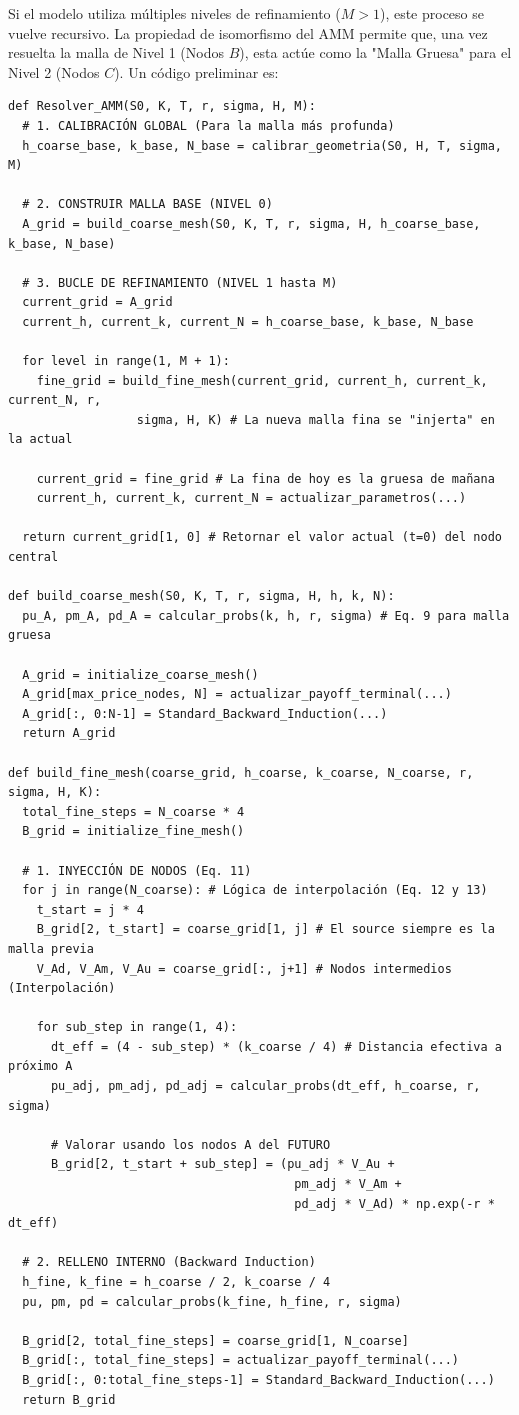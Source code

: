 Si el modelo utiliza múltiples niveles de refinamiento ($M>1$), este proceso se vuelve recursivo. La propiedad de isomorfismo del AMM permite que, una vez resuelta la malla de Nivel 1 (Nodos $B$), esta actúe como la "Malla Gruesa" para el Nivel 2 (Nodos $C$).
Un código preliminar es:

\begin{verbatim}
def Resolver_AMM(S0, K, T, r, sigma, H, M):
  # 1. CALIBRACIÓN GLOBAL (Para la malla más profunda)
  h_coarse_base, k_base, N_base = calibrar_geometria(S0, H, T, sigma, M)

  # 2. CONSTRUIR MALLA BASE (NIVEL 0)
  A_grid = build_coarse_mesh(S0, K, T, r, sigma, H, h_coarse_base, k_base, N_base)
  
  # 3. BUCLE DE REFINAMIENTO (NIVEL 1 hasta M)
  current_grid = A_grid
  current_h, current_k, current_N = h_coarse_base, k_base, N_base
  
  for level in range(1, M + 1):
    fine_grid = build_fine_mesh(current_grid, current_h, current_k, current_N, r, 
                  sigma, H, K) # La nueva malla fina se "injerta" en la actual
    
    current_grid = fine_grid # La fina de hoy es la gruesa de mañana
    current_h, current_k, current_N = actualizar_parametros(...)
  
  return current_grid[1, 0] # Retornar el valor actual (t=0) del nodo central

def build_coarse_mesh(S0, K, T, r, sigma, H, h, k, N):
  pu_A, pm_A, pd_A = calcular_probs(k, h, r, sigma) # Eq. 9 para malla gruesa
  
  A_grid = initialize_coarse_mesh()
  A_grid[max_price_nodes, N] = actualizar_payoff_terminal(...)
  A_grid[:, 0:N-1] = Standard_Backward_Induction(...)
  return A_grid

def build_fine_mesh(coarse_grid, h_coarse, k_coarse, N_coarse, r, sigma, H, K):   
  total_fine_steps = N_coarse * 4
  B_grid = initialize_fine_mesh()
  
  # 1. INYECCIÓN DE NODOS (Eq. 11)
  for j in range(N_coarse): # Lógica de interpolación (Eq. 12 y 13)
    t_start = j * 4
    B_grid[2, t_start] = coarse_grid[1, j] # El source siempre es la malla previa
    V_Ad, V_Am, V_Au = coarse_grid[:, j+1] # Nodos intermedios (Interpolación)
    
    for sub_step in range(1, 4):
      dt_eff = (4 - sub_step) * (k_coarse / 4) # Distancia efectiva a próximo A
      pu_adj, pm_adj, pd_adj = calcular_probs(dt_eff, h_coarse, r, sigma)
      
      # Valorar usando los nodos A del FUTURO
      B_grid[2, t_start + sub_step] = (pu_adj * V_Au + 
                                        pm_adj * V_Am + 
                                        pd_adj * V_Ad) * np.exp(-r * dt_eff)
    
  # 2. RELLENO INTERNO (Backward Induction)
  h_fine, k_fine = h_coarse / 2, k_coarse / 4
  pu, pm, pd = calcular_probs(k_fine, h_fine, r, sigma)

  B_grid[2, total_fine_steps] = coarse_grid[1, N_coarse]
  B_grid[:, total_fine_steps] = actualizar_payoff_terminal(...)
  B_grid[:, 0:total_fine_steps-1] = Standard_Backward_Induction(...)
  return B_grid
\end{verbatim}

